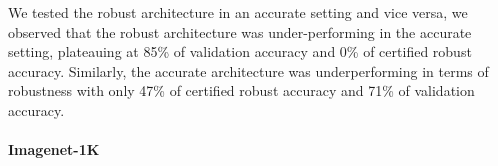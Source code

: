     We tested the robust architecture in an accurate setting and vice versa, we observed that the robust architecture was under-performing in the accurate setting, plateauing at 85\% of validation accuracy and 0\% of certified robust accuracy. Similarly, the accurate architecture was underperforming in terms of robustness with only 47\% of certified robust accuracy and 71\% of validation accuracy.
    


\paragraph{Imagenet-1K \cite{deng2009imagenet}}

